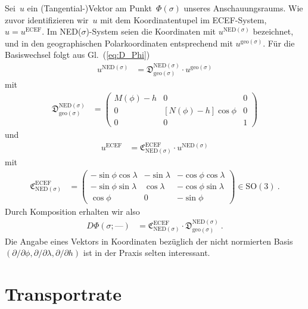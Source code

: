 \documentclass[10pt,a4paper]{article}
\newcommand{\nul}{\textrm{---}}
\begin{document}
Sei~$u$ ein (Tangential-)Vektor am Punkt~$\Phi(\sigma)$ unseres Anschauungsraums.
Wie zuvor identifizieren wir~$u$ mit dem Koordinatentupel im ECEF-System, $u=u^{\mathrm{ECEF}}$.
Im NED($\sigma$)-System seien die Koordinaten mit $u^{\mathrm{NED}(\sigma)}$ bezeichnet, und in den geographischen Polarkoordinaten entsprechend mit $u^{\mathrm{geo}(\sigma)}$.
Für die Basiswechsel folgt aus Gl.~(\ref{eq:D_Phi})
\begin{align}
	u^{\mathrm{NED}(\sigma)} &= 
	\mathfrak{D}^{\mathrm{NED}(\sigma)}_{\mathrm{geo}(\sigma)}
	\cdot
	u^{\mathrm{geo}(\sigma)}
\end{align}
mit 
\begin{align}
	\mathfrak{D}^{\mathrm{NED}(\sigma)}_{\mathrm{geo}(\sigma)} &= 
	\begin{pmatrix}
		M(\phi) - h & 0 & 0 \\
		0 & [N(\phi) - h]\cos\phi & 0 \\
		0 & 0 & 1				
	\end{pmatrix}
\end{align}
und
\begin{align}
	u^{\mathrm{ECEF}} &= 
	\mathfrak{C}^{\mathrm{ECEF}}_{\mathrm{NED}(\sigma)}
	\cdot
	u^{\mathrm{NED}(\sigma)}
\end{align}
mit 
\begin{align}
	\mathfrak{C}^{\mathrm{ECEF}}_{\mathrm{NED}(\sigma)} &= 
	\begin{pmatrix}
		-\sin\phi\cos\lambda & -\sin\lambda & -\cos\phi\cos\lambda\\
		-\sin\phi\sin\lambda & \cos\lambda & -\cos\phi\sin\lambda\\
		\cos\phi & 0 & -\sin\phi
	\end{pmatrix}
	\in\mathrm{SO}(3)
	\ .
\end{align}
Durch Komposition erhalten wir also
\begin{align}
\label{eq:D_Phi_decomposition}
	D\Phi(\sigma; \nul)
	&=
	\mathfrak{C}^{\mathrm{ECEF}}_{\mathrm{NED}(\sigma)}
	\cdot
	\mathfrak{D}^{\mathrm{NED}(\sigma)}_{\mathrm{geo}(\sigma)}
	\ .
\end{align}
Die Angabe eines Vektors in Koordinaten bezüglich der nicht normierten Basis $(\partial/\partial\phi,\partial/\partial\lambda,\partial/\partial h)$ ist in der Praxis selten interessant.


\section{Transportrate}
\end{document}
